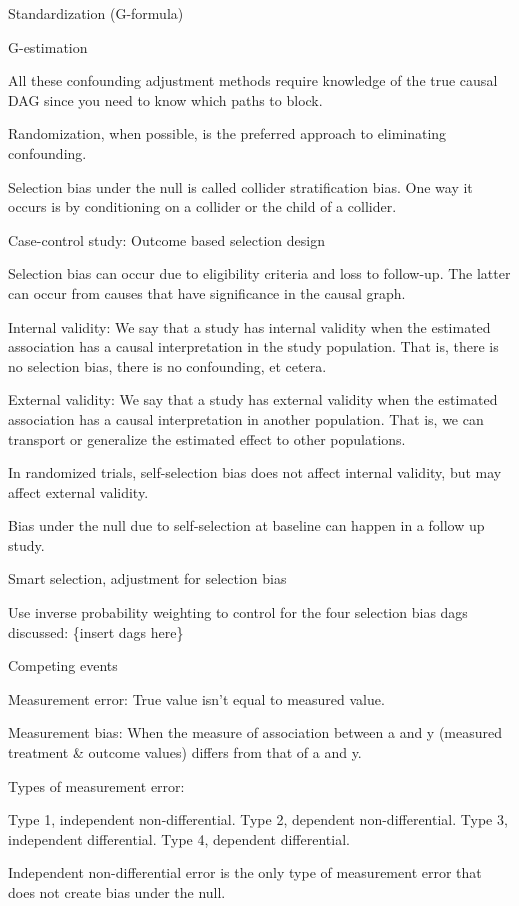 \documentclass[]{book}
\begin{document}
Standardization (G-formula)

G-estimation

All these confounding adjustment methods require knowledge of the true causal DAG since you need to know which paths to block.

Randomization, when possible, is the preferred approach to eliminating confounding.

Selection bias under the null is called collider stratification bias. One way it occurs is by conditioning on a collider or the child of a collider.

Case-control study: Outcome based selection design

Selection bias can occur due to eligibility criteria and loss to follow-up. The latter can occur from causes that have significance in the causal graph.

Internal validity: We say that a study has internal validity when the estimated association has a causal interpretation in the study population. That is, there is no selection bias, there is no confounding, et cetera.

External validity: We say that a study has external validity when the estimated association has a causal interpretation in another population. That is, we can transport or generalize the estimated effect to other populations.

In randomized trials, self-selection bias does not affect internal validity, but may affect external validity.

Bias under the null due to self-selection at baseline can happen in a follow up study.

Smart selection, adjustment for selection bias

Use inverse probability weighting to control for the four selection bias dags discussed: \{insert dags here\}

Competing events

Measurement error: True value isn't equal to measured value.

Measurement bias: When the measure of association between a and y (measured treatment \& outcome values) differs from that of a and y.

Types of measurement error:

Type 1, independent non-differential.
Type 2, dependent non-differential.
Type 3, independent differential.
Type 4, dependent differential.

Independent non-differential error is the only type of measurement error that does not create bias under the null.
\end{document}
